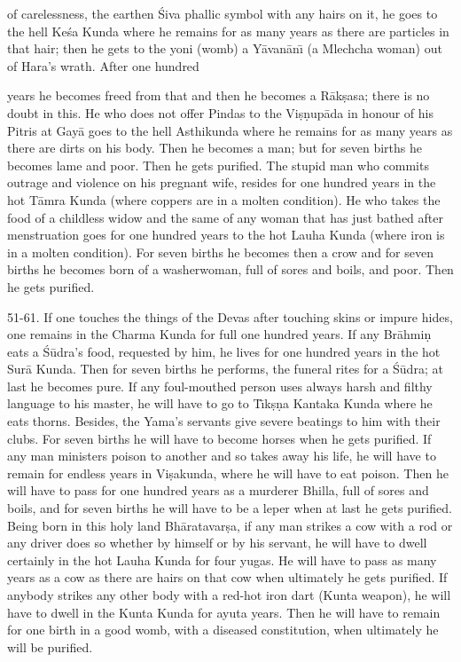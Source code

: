 of carelessness, the earthen \'Siva phallic symbol with any hairs on it, he goes to the hell Ke\'sa Kunda where he remains for as many years as there are particles in that hair; then he gets to the yoni (womb) a Y\=avan\=an\={\i} (a Mlechcha woman) out of Hara's wrath. After one hundred

years he becomes freed from that and then he becomes a R\=ak\d{s}asa; there is no doubt in this. He who does not offer Pindas to the Vi\d{s}\d{n}up\=ada in honour of his Pitris at Gay\=a goes to the hell Asthikunda where he remains for as many years as there are dirts on his body. Then he becomes a man; but for seven births he becomes lame and poor. Then he gets purified. The stupid man who commits outrage and violence on his pregnant wife, resides for one hundred years in the hot T\=amra Kunda (where coppers are in a molten condition). He who takes the food of a childless widow and the same of any woman that has just bathed after menstruation goes for one hundred years to the hot Lauha Kunda (where iron is in a molten condition). For seven births he becomes then a crow and for seven births he becomes born of a washerwoman, full of sores and boils, and poor. Then he gets purified.

51-61. If one touches the things of the Devas after touching skins or impure hides, one remains in the Charma Kunda for full one hundred years. If any Br\=ahmi\d{n} eats a \'S\=udra's food, requested by him, he lives for one hundred years in the hot Sur\=a Kunda. Then for seven births he performs, the funeral rites for a \'S\=udra; at last he becomes pure. If any foul-mouthed person uses always harsh and filthy language to his master, he will have to go to T\={\i}k\d{s}\d{n}a Kantaka Kunda where he eats thorns. Besides, the Yama's servants give severe beatings to him with their clubs. For seven births he will have to become horses when he gets purified. If any man ministers poison to another and so takes away his life, he will have to remain for endless years in Vi\d{s}akunda, where he will have to eat poison. Then he will have to pass for one hundred years as a murderer Bhilla, full of sores and boils, and for seven births he will have to be a leper when at last he gets purified. Being born in this holy land Bh\=aratavar\d{s}a, if any man strikes a cow with a rod or any driver does so whether by himself or by his servant, he will have to dwell certainly in the hot Lauha Kunda for four yugas. He will have to pass as many years as a cow as there are hairs on that cow when ultimately he gets purified. If anybody strikes any other body with a red-hot iron dart (Kunta weapon), he will have to dwell in the Kunta Kunda for ayuta years. Then he will have to remain for one birth in a good womb, with a diseased constitution, when ultimately he will be purified.

